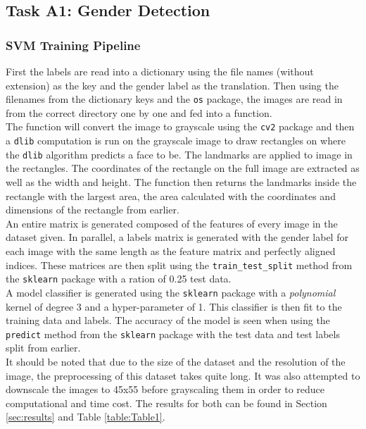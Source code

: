 \documentclass{article}
\begin{document}
    \subsection{Task A1: Gender Detection}
	\subsubsection{SVM Training Pipeline}
	 First the labels are read into a dictionary using the file names (without extension) as the key and the gender label as the translation. Then using the filenames from the dictionary keys and the \verb|os| package, the images are read in from the correct directory one by one and fed into a function.\\
	 
	 The function will convert the image to grayscale using the \verb|cv2| package and then a \verb|dlib| computation is run on the grayscale image to draw rectangles on where the \verb|dlib| algorithm predicts a face to be. The landmarks are applied to image in the rectangles. The coordinates of the rectangle on the full image are extracted as well as the width and height. The function then returns the landmarks inside the rectangle with the largest area, the area calculated with the coordinates and dimensions of the rectangle from earlier.\\
	 
	 An entire matrix is generated composed of the features of every image in the dataset given. In parallel, a labels matrix is generated with the gender label for each image with the same length as the feature matrix and perfectly aligned indices. These matrices are then split using the \verb|train_test_split| method from the \verb|sklearn| package with a ration of 0.25 test data.\\
	 
	 A model classifier is generated using the \verb|sklearn| package with a \textit{polynomial} kernel of degree 3 and a hyper-parameter of 1. This classifier is then fit to the training data and labels. The accuracy of the model is seen when using the \verb|predict| method from the \verb|sklearn| package with the test data and test labels split from earlier.\\
	 
	 It should be noted that due to the size of the dataset and the resolution of the image, the preprocessing of this dataset takes quite long. It was also attempted to downscale the images to 45x55 before grayscaling them in order to reduce computational and time cost. The results for both can be found in Section \ref{sec:results} and Table \ref{table:Table1}.
\end{document}
